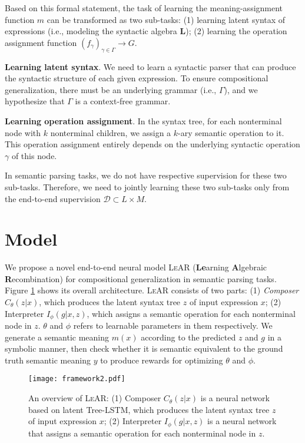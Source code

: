 \documentclass[11pt,a4paper]{article}
\begin{document}
Based on this formal statement, the task of learning the meaning-assignment function $m$ can be transformed as two sub-tasks: (1) learning latent syntax of expressions (i.e., modeling the syntactic algebra $\mathbf{L}$); (2) learning the operation assignment function $(f_\gamma)_{\gamma\in\Gamma}\to G$.

\noindent \textbf{Learning latent syntax}.
We need to learn a syntactic parser that can produce the syntactic structure of each given expression.
To ensure compositional generalization, there must be an underlying grammar (i.e., $\Gamma$), and we hypothesize that $\Gamma$ is a context-free grammar.


\noindent \textbf{Learning operation assignment}.
In the syntax tree, for each nonterminal node with $k$ nonterminal children, we assign a $k$-ary semantic operation to it.
This operation assignment entirely depends on the underlying syntactic operation $\gamma$ of this node.

In semantic parsing tasks, we do not have respective supervision for these two sub-tasks.
Therefore, we need to jointly learning these two sub-tasks only from the end-to-end supervision $\mathcal{D}\subset L\times M$.

\section{Model}\label{sec:Model}

We propose a novel end-to-end neural model \textsc{LeAR} (\textbf{Le}arning \textbf{A}lgebraic \textbf{R}ecombination) for compositional generalization in semantic parsing tasks.
Figure \ref{fig:framework} shows its overall architecture.
\textsc{LeAR} consists of two parts:
(1) \emph{Composer} $C_\theta(z|x)$, which produces the latent syntax tree $z$ of input expression $x$;
(2) Interpreter $I_\phi(g|x, z)$, which assigns a semantic operation for each nonterminal node in $z$.
$\theta$ and $\phi$ refers to learnable parameters in them respectively.
We generate a semantic meaning $m(x)$ according to the predicted $z$ and $g$ in a symbolic manner, then check whether it is semantic equivalent to the ground truth semantic meaning $y$ to produce rewards for optimizing $\theta$ and $\phi$.

\begin{figure}[t]
    \centering
    \texttt{[image: framework2.pdf]}
    \caption{An overview of \textsc{LeAR}: (1) Composer $C_\theta(z|x)$ is a neural network based on latent Tree-LSTM, which produces the latent syntax tree $z$ of input expression $x$; (2) Interpreter $I_\phi(g|x, z)$ is a neural network that assigns a semantic operation for each nonterminal node in $z$.}
    \label{fig:framework}
\end{figure}
\end{document}

